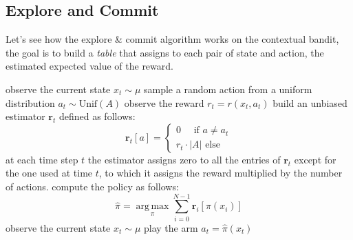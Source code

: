 \documentclass[10pt, a4paper]{report}
\begin{document}
\subsection{Explore and Commit}
Let's see how the explore \& commit algorithm works on the contextual bandit, the goal is to build a \textit{table} that assigns to each pair of state and action, the estimated expected value of the reward.
\begin{algorithm}[H]
\caption{Explore \& Commit}\label{alg:explore_commit_context}
\begin{algorithmic}[1]
\State observe the current state $x_t\sim\mu$
\State sample a random action from a uniform distribution $a_t\sim\text{Unif}(A)$
\State observe the reward $r_t=r(x_t,a_t)$
\State build an unbiased estimator $\mathbf r_t$ defined as follows:\begin{equation}
    \mathbf r_t[a]=\begin{cases}
        0\quad\text{ if }a\ne a_t\\ 
        r_t\cdot |A|\text{ else }
    \end{cases}
\end{equation}
at each time step $t$ the estimator assigns zero to all the entries of $\mathbf r_t$ except for the one used at time $t$, to which it assigns the reward multiplied by the number of actions.
\EndFor
\State compute the policy as follows:\begin{equation}
    \hat\pi=\operatorname*{arg\,max}_{\pi}\sum_{i=0}^{N-1}\mathbf r_i[\pi(x_i)]
\end{equation}
\State observe the current state $x_t\sim\mu$
\State play the arm $a_t=\hat\pi(x_t)$
\EndFor
\end{algorithmic}
\end{algorithm}
\end{document}
